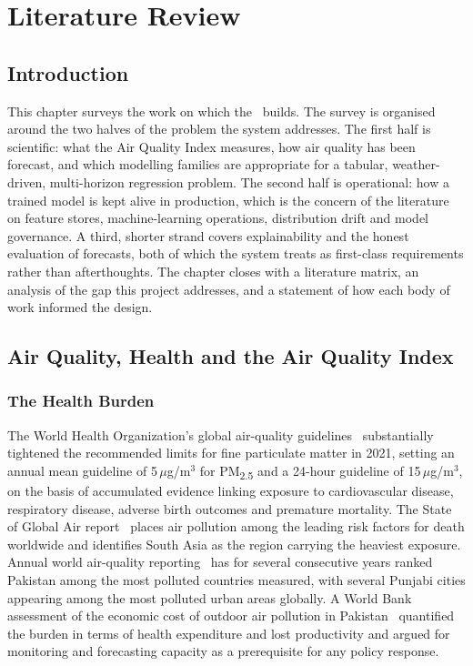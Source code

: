 \chapter{Literature Review}
\label{ch:literature}

\section{Introduction}
This chapter surveys the work on which the \projname\ builds. The survey is
organised around the two halves of the problem the system addresses. The first
half is scientific: what the Air Quality Index measures, how air quality has been
forecast, and which modelling families are appropriate for a tabular,
weather-driven, multi-horizon regression problem. The second half is
operational: how a trained model is kept alive in production, which is the
concern of the literature on feature stores, machine-learning operations,
distribution drift and model governance. A third, shorter strand covers
explainability and the honest evaluation of forecasts, both of which the system
treats as first-class requirements rather than afterthoughts. The chapter closes
with a literature matrix, an analysis of the gap this project addresses, and a
statement of how each body of work informed the design.

\section{Air Quality, Health and the Air Quality Index}

\subsection{The Health Burden}
The World Health Organization's global air-quality guidelines~\cite{ref:who}
substantially tightened the recommended limits for fine particulate matter in
2021, setting an annual mean guideline of 5\,$\mu$g/m$^3$ for
PM\textsubscript{2.5} and a 24-hour guideline of 15\,$\mu$g/m$^3$, on the basis
of accumulated evidence linking exposure to cardiovascular disease, respiratory
disease, adverse birth outcomes and premature mortality. The State of Global Air
report~\cite{ref:sga} places air pollution among the leading risk factors for
death worldwide and identifies South Asia as the region carrying the heaviest
exposure. Annual world air-quality reporting~\cite{ref:iqair} has for several
consecutive years ranked Pakistan among the most polluted countries measured,
with several Punjabi cities appearing among the most polluted urban areas
globally. A World Bank assessment of the economic cost of outdoor air pollution
in Pakistan~\cite{ref:worldbank} quantified the burden in terms of health
expenditure and lost productivity and argued for monitoring and forecasting
capacity as a prerequisite for any policy response.

